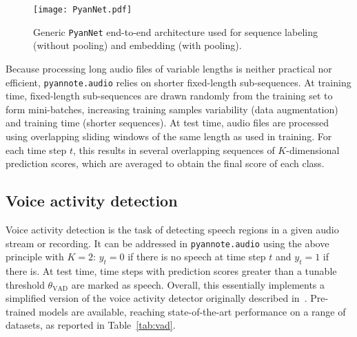 \documentclass{article}
\begin{document}
\begin{figure*}[]
    \centering
    \texttt{[image: PyanNet.pdf]}
    \caption{Generic {\small \texttt{PyanNet}} end-to-end architecture used for sequence labeling (without pooling) and embedding (with pooling).}
    \label{fig:pyannet}
\end{figure*}

Because processing long audio files of variable lengths is neither practical nor efficient, {\small \texttt{pyannote.audio}} relies on shorter fixed-length sub-sequences. At training time, fixed-length sub-sequences are drawn randomly from the training set to form  mini-batches, increasing training samples variability (data augmentation) and training time (shorter sequences). At test time, audio files are processed using overlapping sliding windows of the same length as used in training. For each time step $t$, this results in several overlapping sequences of $K$-dimensional prediction scores, which are averaged to obtain the final score of each class.

\vspace{-0.17cm}
\subsection{Voice activity detection}
\label{ssec:vad}

Voice activity detection is the task of detecting speech regions in a given audio stream or recording. It can be addressed in {\small\texttt{pyannote.audio}} using the above principle with $K=2$: $y_{t} = 0$ if there is no speech at time step $t$ and $y_t = 1$ if there is. At test time, time steps with prediction scores greater than a tunable threshold $\theta_{\text{VAD}}$ are marked as speech. Overall, this essentially implements a simplified version of the voice activity detector originally described in~\cite{Gelly2018}. Pre-trained models are available, reaching state-of-the-art performance on a range of datasets, as reported in Table~\ref{tab:vad}.
\end{document}

